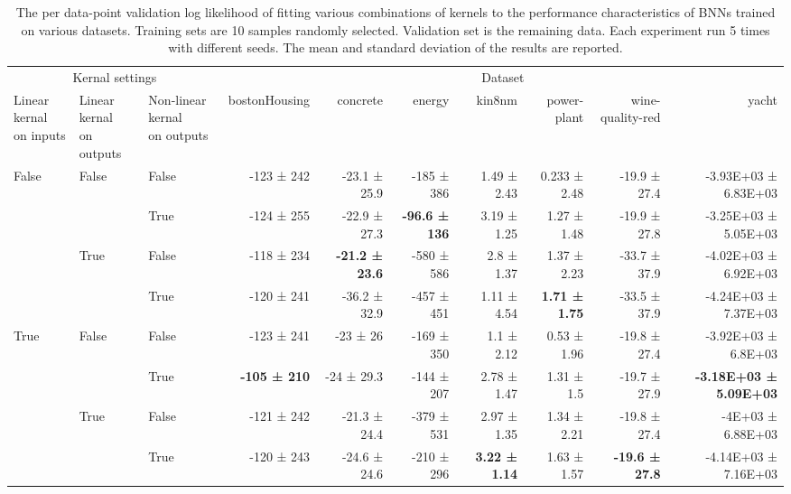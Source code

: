 {\begin{landscape}
		\begin{table}
			\scriptsize
			\begin{tabular}{lll|rrrrrrr}
				\toprule
				\multicolumn{3}{c}{Kernal settings} & \multicolumn{7}{c}{Dataset} \\
				\shortstack[l]{Linear kernal\\on inputs} & \shortstack[l]{Linear kernal\\on outputs} & \shortstack[l]{Non-linear kernal\\on outputs} & bostonHousing & concrete & energy & kin8nm & power-plant & wine-quality-red &   yacht \\
				\midrule
				\multirow{4}{*}{False} & \multirow{2}{*}{False} & False &               -123 ± 242 &  -23.1 ± 25.9 &   -185 ± 386 &  1.49 ± 2.43 &  0.233 ± 2.48 &     -19.9 ± 27.4 &  -3.93E+03 ± 6.83E+03 \\
				&       & True  &               -124 ± 255 &  -22.9 ± 27.3 &  \textbf{-96.6 ± 136} &  3.19 ± 1.25 &   1.27 ± 1.48 &     -19.9 ± 27.8 &  -3.25E+03 ± 5.05E+03 \\
				\cline{2-10}
				& \multirow{2}{*}{True} & False &               -118 ± 234 &  \textbf{-21.2 ± 23.6} &   -580 ± 586 &   2.8 ± 1.37 &   1.37 ± 2.23 &     -33.7 ± 37.9 &  -4.02E+03 ± 6.92E+03 \\
				&       & True  &               -120 ± 241 &  -36.2 ± 32.9 &   -457 ± 451 &  1.11 ± 4.54 &   \textbf{1.71 ± 1.75} &     -33.5 ± 37.9 &  -4.24E+03 ± 7.37E+03 \\
				\cline{1-10}
				\cline{2-10}
				\multirow{4}{*}{True} & \multirow{2}{*}{False} & False &               -123 ± 241 &      -23 ± 26 &   -169 ± 350 &   1.1 ± 2.12 &   0.53 ± 1.96 &     -19.8 ± 27.4 &   -3.92E+03 ± 6.8E+03 \\
				&       & True  &               \textbf{-105 ± 210} &    -24 ± 29.3 &   -144 ± 207 &  2.78 ± 1.47 &    1.31 ± 1.5 &     -19.7 ± 27.9 &  \textbf{-3.18E+03 ± 5.09E+03} \\
				\cline{2-10}
				& \multirow{2}{*}{True} & False &               -121 ± 242 &  -21.3 ± 24.4 &   -379 ± 531 &  2.97 ± 1.35 &   1.34 ± 2.21 &     -19.8 ± 27.4 &     -4E+03 ± 6.88E+03 \\
				&       & True  &               -120 ± 243 &  -24.6 ± 24.6 &   -210 ± 296 &  \textbf{3.22 ± 1.14} &   1.63 ± 1.57 &     \textbf{-19.6 ± 27.8} &  -4.14E+03 ± 7.16E+03 \\
				\bottomrule
			\end{tabular}
			\caption{The per data-point validation log likelihood of fitting various combinations of kernels to the performance characteristics of BNNs trained on various datasets. Training sets are 10 samples randomly selected. Validation set is the remaining data. Each experiment run 5 times with different seeds. The mean and standard deviation of the results are reported.}
			\label{tbl:kernel_small}
		\end{table}
		

\end{landscape}}
